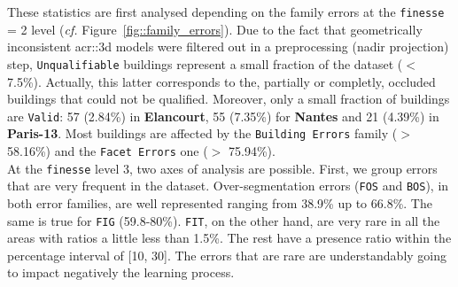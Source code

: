         These statistics are first analysed depending on the family errors at the \texttt{finesse} = 2 level (\textit{cf.} Figure~\ref{fig::family_errors}).
        Due to the fact that geometrically inconsistent \gls{acr::3d} models were filtered out in a preprocessing (nadir projection) step, \texttt{Unqualifiable} buildings represent a small fraction of the dataset ($<$ 7.5\%).
        Actually, this latter corresponds to the, partially or completly, occluded buildings that could not be qualified.
        Moreover, only a small fraction of buildings are \texttt{Valid}:
        57 (2.84\%) in \textbf{Elancourt}, 55 (7.35\%) for \textbf{Nantes} and 21 (4.39\%) in \textbf{Paris-13}.
        Most buildings are affected by the \texttt{Building Errors} family ($>$ 58.16\%) and the \texttt{Facet Errors} one ($>$ 75.94\%).\\

        At the \texttt{finesse} level 3, two axes of analysis are possible.
        First, we group errors that are very frequent in the dataset.
        Over-segmentation errors (\texttt{FOS} and \texttt{BOS}), in both error families, are well represented ranging from 38.9\% up to 66.8\%.
        The same is true for \texttt{FIG} (59.8-80\%).
        \texttt{FIT}, on the other hand, are very rare in all the areas with ratios a little less than 1.5\%.
        The rest have a presence ratio within the percentage interval of [10, 30].
        The errors that are rare are understandably going to impact negatively the learning process.\\
        
